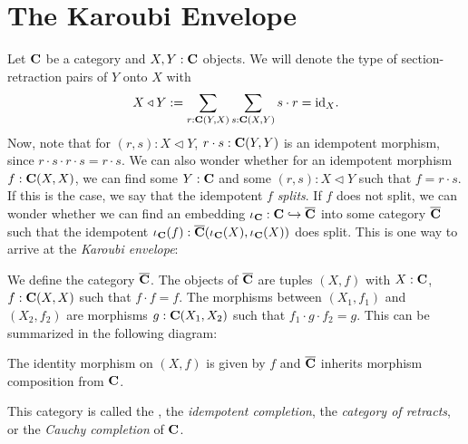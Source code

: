 \section{The Karoubi Envelope}\label{sec:karoubi-envelope}
Let $ \mathbf{C} $ be a category and $ X, Y : \mathbf{C} $ objects. We will denote the type of section-retraction pairs of $ Y $ onto $ X $ with
\[ X \triangleleft Y := \sum_{r : \mathbf{C}(Y, X)} \sum_{s : \mathbf{C}(X, Y)} s \cdot r = \text{id}_{X}. \]
Now, note that for $ (r, s) : X \triangleleft Y $, $ r \cdot s: \mathbf{C}(Y, Y) $ is an idempotent morphism, since $ r \cdot s \cdot r \cdot s = r \cdot s $. We can also wonder whether for an idempotent morphism $ f: \mathbf{C}(X, X) $, we can find some $ Y : \mathbf{C} $ and some $ (r, s) : X \triangleleft Y $ such that $ f = r \cdot s $. If this is the case, we say that the idempotent $ f $ \textit{splits}. If $ f $ does not split, we can wonder whether we can find an embedding $ \iota_{\mathbf{C}} : \mathbf{C} \hookrightarrow \overline {\mathbf{C}} $ into some category $ \overline {\mathbf{C}} $ such that the idempotent $ \iota_{\mathbf{C}}(f): \overline {\mathbf{C}}(\iota_{\mathbf{C}}(X), \iota_{\mathbf{C}}(X)) $ does split. This is one way to arrive at the \textit{Karoubi envelope}:

\begin{definition}
  We define the category $ \overline {\mathbf{C}} $. The objects of $ \overline {\mathbf{C}} $ are tuples $ (X, f) $ with $ X: \mathbf{C} $, $ f: \mathbf{C}(X, X) $ such that $ f \cdot f = f $. The morphisms between $ (X_1, f_1) $ and $ (X_2, f_2) $ are morphisms $ g: \mathbf{C}(X_1, X_2) $ such that $ f_1 \cdot g \cdot f_2 = g $. This can be summarized in the following diagram:
  \begin{center}
  \end{center}
  The identity morphism on $ (X, f) $ is given by $ f $ and $ \overline {\mathbf{C}} $ inherits morphism composition from $ \mathbf{C} $.
\end{definition}
This category is called the , the \textit{idempotent completion}, the \textit{category of retracts}, or the \textit{Cauchy completion} of $ \mathbf{C} $.

